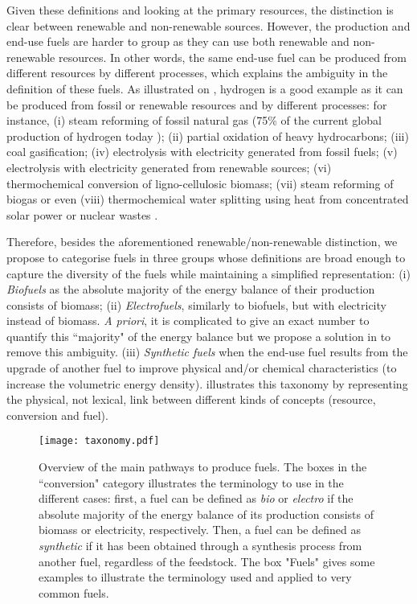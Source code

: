 
Given these definitions and looking at the primary resources, the distinction is clear between renewable and non-renewable sources. However, the production and end-use fuels are harder to group as they can use both renewable and non-renewable resources. In other words, the same end-use fuel can be produced from different resources by different processes, which explains the ambiguity in the definition of these fuels. As illustrated on , hydrogen is a good example as it can be produced from fossil or renewable resources and by different processes: for instance, (i) steam reforming of fossil natural gas (75\% of the current global production of hydrogen today \cite{iea2019hydrogen}); (ii) partial oxidation of heavy hydrocarbons; (iii) coal gasification; (iv) electrolysis with electricity generated from fossil fuels; (v) electrolysis with electricity generated from renewable sources; (vi) thermochemical conversion of ligno-cellulosic biomass; (vii) steam reforming of biogas or even (viii) thermochemical water splitting using heat from concentrated solar power or nuclear wastes \cite{acar2014}. 

Therefore, besides the aforementioned renewable/non-renewable distinction, we propose to categorise fuels in three groups whose definitions are broad enough to capture the diversity of the fuels while maintaining a simplified representation: (i) \textit{Biofuels} as the absolute majority of the energy balance of their production consists of biomass; (ii) \textit{Electrofuels}, similarly to biofuels, but with electricity instead of biomass. \textit{A priori}, it is complicated to give an exact number to quantify this ``majority" of the energy balance but we propose a solution in  to remove this ambiguity. (iii) \textit{Synthetic fuels} when the end-use fuel results from the upgrade of another fuel to improve physical and/or chemical characteristics (\eg to increase the volumetric energy density).  illustrates this taxonomy by representing the physical, not lexical, link between different kinds of concepts (\eg resource, conversion and fuel).

\begin{figure}[htbp]
    \centering
    \texttt{[image: taxonomy.pdf]}
    \caption{Overview of the main pathways to produce fuels. The boxes in the ``conversion" category illustrates the terminology to use in the different cases: first, a fuel can be defined as \emph{bio} or \emph{electro} if the absolute majority of the energy balance of its production consists of biomass or electricity, respectively. Then, a fuel can be defined as \emph{synthetic} if it has been obtained through a synthesis process from another fuel, regardless of the feedstock. The box "Fuels" gives some examples to illustrate the terminology used and applied to very common fuels.}
    \label{fig:synfuels_paths}
\end{figure}

